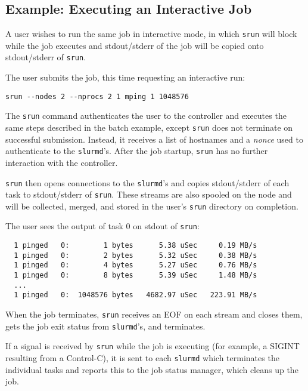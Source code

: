 \subsection{Example:  Executing an Interactive Job}

A user wishes to run the same job in interactive mode, in which {\tt srun}
will block while the job executes and stdout/stderr of the job will be 
copied onto stdout/stderr of {\tt srun}.

The user submits the job, this time requesting an interactive run:
\begin{verbatim}
srun --nodes 2 --nprocs 2 1 mping 1 1048576
\end{verbatim}

The {\tt srun} command authenticates the user to the controller and 
executes the same steps described in the batch example, except {\tt srun} 
does not terminate on successful submission.  Instead, it receives a list of
hostnames and a {\em nonce} used to authenticate to the {\tt slurmd}'s.
After the job startup, {\tt srun} has no further interaction with the 
controller.

{\tt srun} then opens connections to the {\tt slurmd}'s and copies 
stdout/stderr of each task to stdout/stderr of {\tt srun}.  These streams
are also spooled on the node and will be collected, merged, and stored
in the user's {\tt srun} directory on completion.

The user sees the output of task 0 on stdout of {\tt srun}:

\begin{verbatim}
  1 pinged   0:        1 bytes      5.38 uSec     0.19 MB/s                     
  1 pinged   0:        2 bytes      5.32 uSec     0.38 MB/s                     
  1 pinged   0:        4 bytes      5.27 uSec     0.76 MB/s                     
  1 pinged   0:        8 bytes      5.39 uSec     1.48 MB/s                     
  ...
  1 pinged   0:  1048576 bytes   4682.97 uSec   223.91 MB/s              
\end{verbatim}

When the job terminates, {\tt srun} receives an EOF on each stream and
closes them, gets the job exit status from {\tt slurmd}'s, and terminates.

If a signal is received by {\tt srun} while the job is executing (for example,
a SIGINT resulting from a Control-C), it is sent to each {\tt slurmd} which 
terminates the individual tasks and reports this to the job status manager,
which cleans up the job.

